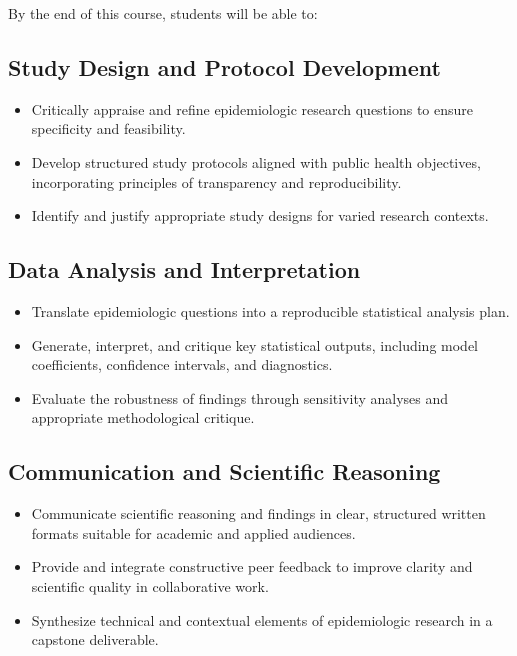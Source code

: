 \documentclass[
]{article}
\providecommand{\tightlist}{%
  \setlength{\itemsep}{0pt}\setlength{\parskip}{0pt}}
\begin{document}
By the end of this course, students will be able to:

\subsection{Study Design and Protocol
Development}\label{study-design-and-protocol-development}

\begin{itemize}
\tightlist
\item
  Critically appraise and refine epidemiologic research questions to
  ensure specificity and feasibility.
\item
  Develop structured study protocols aligned with public health
  objectives, incorporating principles of transparency and
  reproducibility.
\item
  Identify and justify appropriate study designs for varied research
  contexts.
\end{itemize}

\subsection{Data Analysis and
Interpretation}\label{data-analysis-and-interpretation}

\begin{itemize}
\tightlist
\item
  Translate epidemiologic questions into a reproducible statistical
  analysis plan.
\item
  Generate, interpret, and critique key statistical outputs, including
  model coefficients, confidence intervals, and diagnostics.
\item
  Evaluate the robustness of findings through sensitivity analyses and
  appropriate methodological critique.
\end{itemize}

\subsection{Communication and Scientific
Reasoning}\label{communication-and-scientific-reasoning}

\begin{itemize}
\tightlist
\item
  Communicate scientific reasoning and findings in clear, structured
  written formats suitable for academic and applied audiences.
\item
  Provide and integrate constructive peer feedback to improve clarity
  and scientific quality in collaborative work.
\item
  Synthesize technical and contextual elements of epidemiologic research
  in a capstone deliverable.
\end{itemize}
\end{document}
